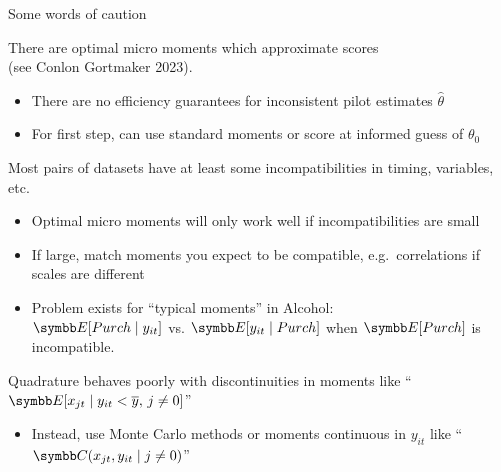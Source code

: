 \documentclass[aspectratio=169,10pt]{beamer}
\begin{document}
\begin{frame}{Some words of caution}
    
    \begin{wideitemize}
    \item There are \alert{optimal micro moments} which approximate scores\\ (see Conlon Gortmaker 2023).
        \begin{itemize}
            \item There are no efficiency guarantees for \alert{inconsistent} pilot estimates $\hat{\theta}$
            \item For first step, can use standard moments or score at informed guess of $\theta_0$
        \end{itemize}
        
        \item Most pairs of datasets have at least some  \alert{incompatibilities} in timing, variables, etc.
        \begin{itemize}
            \item Optimal micro moments will only work well if incompatibilities are small
            \item If large, match moments you expect to be compatible, e.g.\ correlations if scales are different
            \item Problem exists for ``typical moments'' in Alcohol:\\
             $\E[Purch \mid  y_{it}]$ vs. $\E[y_{it} \mid Purch]$ when $\E[Purch]$ is \alert{incompatible}.
        \end{itemize}
    
        \item Quadrature behaves poorly with \alert{discontinuities} in moments like ``$\E[x_{jt} \mid y_{it} < \overline{y}, \, j \neq 0]$''
        \begin{itemize}
            \item Instead, use Monte Carlo methods or moments continuous in $y_{it}$ like ``$\Cov(x_{jt}, y_{it} \mid j \neq 0)$''
        \end{itemize}
    \end{wideitemize}
\end{frame}
\end{document}
